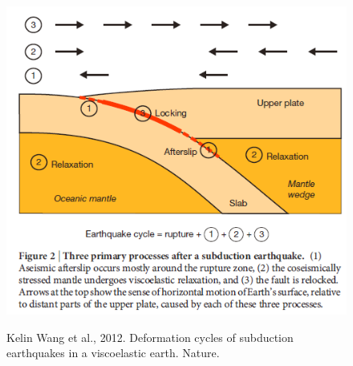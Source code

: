 ﻿\documentclass{beamer}
\begin{document}
\begin{frame}

\begin{columns}[c] %

\begin{figure}
  \centering
  \includegraphics[scale=0.35]{./pic/wangnature.png}\\
  \caption{Kelin Wang et al., 2012. Deformation cycles of subduction earthquakes in a viscoelastic earth. Nature.}\label{fig_okada}
\end{figure}


\end{columns}
\end{frame}
\end{document}
